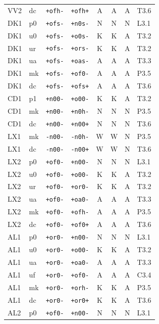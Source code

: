 {\begin{longtable}{@{}llllcccl@{}}
VV2 & dc & \texttt{+ofh-} & \texttt{+ofh+} & A & A & A & T3.6 \\
DK1 & p0 & \texttt{+ofs-} & \texttt{+n0s-} & N & N & N & L3.1 \\
DK1 & u0 & \texttt{+ofs-} & \texttt{+o0s-} & K & K & A & T3.2 \\
DK1 & ur & \texttt{+ofs-} & \texttt{+ors-} & K & K & A & T3.2 \\
DK1 & ua & \texttt{+ofs-} & \texttt{+oas-} & A & A & A & T3.3 \\
DK1 & mk & \texttt{+ofs-} & \texttt{+of0-} & A & A & A & P3.5 \\
DK1 & dc & \texttt{+ofs-} & \texttt{+ofs+} & A & A & A & T3.6 \\
CD1 & p1 & \texttt{+n00-} & \texttt{+o00-} & K & K & A & T3.2 \\
CD1 & mk & \texttt{+n00-} & \texttt{+n0h-} & N & N & N & P3.5 \\
CD1 & dc & \texttt{+n00-} & \texttt{+n00+} & N & N & N & T3.6 \\
LX1 & mk & \texttt{-n00-} & \texttt{-n0h-} & W & W & N & P3.5 \\
LX1 & dc & \texttt{-n00-} & \texttt{-n00+} & W & W & N & T3.6 \\
LX2 & p0 & \texttt{+of0-} & \texttt{+n00-} & N & N & N & L3.1 \\
LX2 & u0 & \texttt{+of0-} & \texttt{+o00-} & K & K & A & T3.2 \\
LX2 & ur & \texttt{+of0-} & \texttt{+or0-} & K & K & A & T3.2 \\
LX2 & ua & \texttt{+of0-} & \texttt{+oa0-} & A & A & A & T3.3 \\
LX2 & mk & \texttt{+of0-} & \texttt{+ofh-} & A & A & A & P3.5 \\
LX2 & dc & \texttt{+of0-} & \texttt{+of0+} & A & A & A & T3.6 \\
AL1 & p0 & \texttt{+or0-} & \texttt{+n00-} & N & N & N & L3.1 \\
AL1 & u0 & \texttt{+or0-} & \texttt{+o00-} & K & K & A & T3.2 \\
AL1 & ua & \texttt{+or0-} & \texttt{+oa0-} & A & A & A & T3.3 \\
AL1 & uf & \texttt{+or0-} & \texttt{+of0-} & A & A & A & C3.4 \\
AL1 & mk & \texttt{+or0-} & \texttt{+orh-} & K & K & A & P3.5 \\
AL1 & dc & \texttt{+or0-} & \texttt{+or0+} & K & K & A & T3.6 \\
AL2 & p0 & \texttt{+of0-} & \texttt{+n00-} & N & N & N & L3.1 \\

\end{longtable}}
